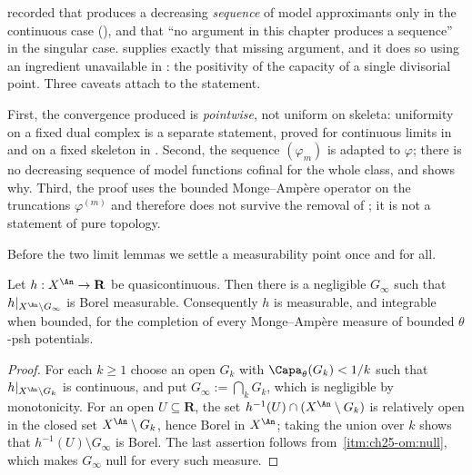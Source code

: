 \begin{remark}
\label{rem:ch25-sequential-vs-ch22}
 recorded that
 produces a decreasing \emph{sequence} of model
approximants only in the continuous case
(), and that ``no argument in
this chapter produces a sequence'' in the singular case.
 supplies exactly that missing
argument, and it does so using an ingredient unavailable in
: the positivity of the capacity of a single
divisorial point.  Three caveats attach to the statement.

First, the convergence produced is \emph{pointwise}, not uniform on
skeleta: uniformity on a fixed dual complex is a separate statement, proved
for continuous limits in  and
on a fixed skeleton in .  Second,
the sequence \((\varphi_m)\) is adapted to \(\varphi\); there is no
decreasing sequence of model functions cofinal for the whole class, and
 shows why.  Third, the proof uses the
bounded Monge--Amp\`ere operator on the truncations
\(\varphi^{(m)}\) and therefore does not survive the removal of
; it is not a statement of pure topology.
\end{remark}

Before the two limit lemmas we settle a measurability point once and for
all.

\begin{lemma}
\label{lem:ch25-quasicontinuous-measurable}
Let \(h:X^{\An}\to\mathbf R\) be quasicontinuous.  Then there is a negligible
\(G_\infty\) such that \(h|_{X^{\An}\setminus G_\infty}\) is Borel
measurable.  Consequently \(h\) is measurable, and integrable when bounded,
for the completion of every Monge--Amp\`ere measure of bounded
\(\theta\)-psh potentials.
\end{lemma}

\begin{proof}
For each \(k\geq1\) choose an open \(G_k\) with
\(\Capa_\theta(G_k)<1/k\) such that \(h|_{X^{\An}\setminus G_k}\) is
continuous, and put \(G_\infty:=\bigcap_kG_k\), which is negligible by
monotonicity.  For an open \(U\subseteq\mathbf R\), the set
\(h^{-1}(U)\cap(X^{\An}\setminus G_k)\) is relatively open in the closed set
\(X^{\An}\setminus G_k\), hence Borel in \(X^{\An}\); taking the union over
\(k\) shows that \(h^{-1}(U)\setminus G_\infty\) is Borel.  The last
assertion follows from
\,\cref{itm:ch25-om:null}, which makes
\(G_\infty\) null for every such measure.
\end{proof}

